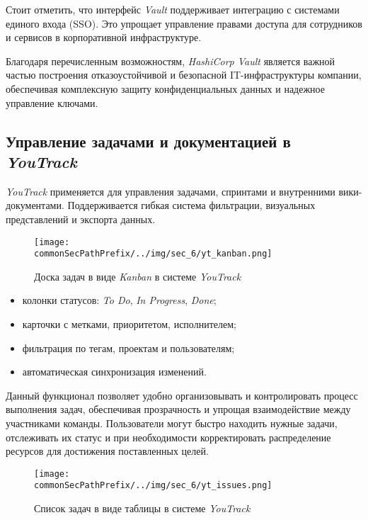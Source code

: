 Стоит отметить, что интерфейс \textit{Vault} поддерживает интеграцию с системами единого входа (SSO). Это упрощает управление правами доступа для сотрудников и сервисов в корпоративной инфраструктуре.

Благодаря перечисленным возможностям, \textit{HashiCorp Vault} является важной частью построения отказоустойчивой и безопасной IT-инфраструктуры компании, обеспечивая комплексную защиту конфиденциальных данных и надежное управление ключами.

\subsection{Управление задачами и документацией в \textit{YouTrack}}

\textit{YouTrack}\cite{youtrack} применяется для управления задачами, спринтами и внутренними вики-документами. Поддерживается гибкая система фильтрации, визуальных представлений и экспорта данных.

\begin{figure}[ht]
    \centering
    \texttt{[image: \\commonSecPathPrefix/../img/sec\_6/yt\_kanban.png]}
    \caption{Доска задач в виде \textit{Kanban} в системе \textit{YouTrack}}
    \label{fig:user_guide:yt_kanban}
\end{figure}

\begin{itemize}
    \item колонки статусов: \textit{To Do}, \textit{In Progress}, \textit{Done};
    \item карточки с метками, приоритетом, исполнителем;
    \item фильтрация по тегам, проектам и пользователям;
    \item автоматическая синхронизация изменений.
\end{itemize}

Данный функционал позволяет удобно организовывать и контролировать процесс выполнения задач, обеспечивая прозрачность и упрощая взаимодействие между участниками команды. Пользователи могут быстро находить нужные задачи, отслеживать их статус и при необходимости корректировать распределение ресурсов для достижения поставленных целей.

\begin{figure}[ht]
    \centering
    \texttt{[image: \\commonSecPathPrefix/../img/sec\_6/yt\_issues.png]}
    \caption{Список задач в виде таблицы в системе \textit{YouTrack}}
    \label{fig:user_guide:yt_issues}
\end{figure}

